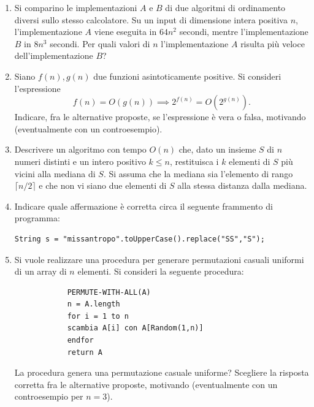 \begin{enumerate}
		\item Si comparino le implementazioni $A$ e $B$ di due algoritmi di ordinamento diversi sullo stesso calcolatore. Su un input di dimensione intera positiva $n$, l'implementazione $A$ viene eseguita in $64n^2$ secondi, mentre l'implementazione $B$ in $8n^3$ secondi. Per quali valori di $n$ l'implementazione $A$ risulta più veloce dell'implementazione $B$?
		
		\item Siano $f(n),g(n)$ due funzioni asintoticamente positive. Si consideri l'espressione
		\[
		f(n)=O(g(n)) \implies 2^{f(n)} = O\!\left(2^{g(n)}\right).
		\]
		Indicare, fra le alternative proposte, se l'espressione è vera o falsa, motivando (eventualmente con un controesempio).
		
		\item [Esercizio del libro, semplificato] Descrivere un algoritmo con tempo $O(n)$ che, dato un insieme $S$ di $n$ numeri distinti e un intero positivo $k \le n$, restituisca i $k$ elementi di $S$ più vicini alla mediana di $S$. Si assuma che la mediana sia l'elemento di rango $\lceil n/2\rceil$ e che non vi siano due elementi di $S$ alla stessa distanza dalla mediana.
		
		\item Indicare quale affermazione è corretta circa il seguente frammento di programma:
		\begin{lstlisting}[style=java]
			String s = "missantropo".toUpperCase().replace("SS","S");
		\end{lstlisting}
		
		\item Si vuole realizzare una procedura per generare permutazioni casuali uniformi di un array di $n$ elementi. Si consideri la seguente procedura:
		\begin{lstlisting}
			PERMUTE-WITH-ALL(A)
			n = A.length
			for i = 1 to n
			scambia A[i] con A[Random(1,n)]
			endfor
			return A
		\end{lstlisting}
		La procedura genera una permutazione casuale uniforme? Scegliere la risposta corretta fra le alternative proposte, motivando (eventualmente con un controesempio per $n=3$).
		

\end{enumerate}
